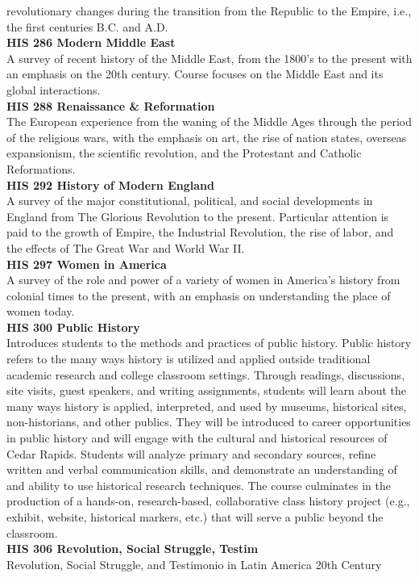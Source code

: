 \documentclass[
  letterpaper,
]{scrbook}
\begin{document}
revolutionary changes during the transition from the Republic to the
Empire, i.e., the first centuries B.C. and A.D.\\
\textbf{HIS 286 Modern Middle East}\\
A survey of recent history of the Middle East, from the 1800's to the
present with an emphasis on the 20th century. Course focuses on the
Middle East and its global interactions.\\
\textbf{HIS 288 Renaissance \& Reformation}\\
The European experience from the waning of the Middle Ages through the
period of the religious wars, with the emphasis on art, the rise of
nation states, overseas expansionism, the scientific revolution, and the
Protestant and Catholic Reformations.\\
\textbf{HIS 292 History of Modern England}\\
A survey of the major constitutional, political, and social developments
in England from The Glorious Revolution to the present. Particular
attention is paid to the growth of Empire, the Industrial Revolution,
the rise of labor, and the effects of The Great War and World War II.\\
\textbf{HIS 297 Women in America}\\
A survey of the role and power of a variety of women in America's
history from colonial times to the present, with an emphasis on
understanding the place of women today.\\
\textbf{HIS 300 Public History}\\
Introduces students to the methods and practices of public history.
Public history refers to the many ways history is utilized and applied
outside traditional academic research and college classroom settings.
Through readings, discussions, site visits, guest speakers, and writing
assignments, students will learn about the many ways history is applied,
interpreted, and used by museums, historical sites, non-historians, and
other publics. They will be introduced to career opportunities in public
history and will engage with the cultural and historical resources of
Cedar Rapids. Students will analyze primary and secondary sources,
refine written and verbal communication skills, and demonstrate an
understanding of and ability to use historical research techniques. The
course culminates in the production of a hands-on, research-based,
collaborative class history project (e.g., exhibit, website, historical
markers, etc.) that will serve a public beyond the classroom.\\
\textbf{HIS 306 Revolution, Social Struggle, Testim}\\
Revolution, Social Struggle, and Testimonio in Latin America 20th
Century
\end{document}
